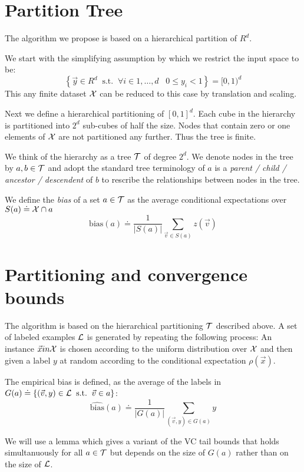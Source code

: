 \documentclass{article}
\newcommand{\X}{{\cal X}}
\renewcommand{\L}{{\cal L}}
\newcommand{\x}{\vec{x}}
\newcommand{\y}{\vec{y}}
\newcommand{\vv}{\vec{v}}
\newcommand{\outcome}{z}
\newcommand{\bias}{\text{bias}}
\newcommand{\empbias}{\widehat{\text{bias}}}
\begin{document}
\iffalse

\section{Partition Tree}

The algorithm we propose is based on a hierarchical partition of $R^d$.

We start with the simplifying assumption by which we restrict the
input space to be:
\newcommand{\Cube}{\text{Cube}}
\[
\left\{\y \in R^d\;\; \text{s.t.}\;\; \forall i \in 1,\ldots,d\;\;\; 0
\leq y_i < 1   \right\} = [0,1)^d
\]
This any finite dataset $\X$ can be reduced to this case by
translation and scaling.

\newcommand{\tree}{{\cal T}}

Next we define a hierarchical partitioning of $[0,1]^d$. Each cube
in the hierarchy is partitioned into $2^d$ sub-cubes of half the size.
Nodes that contain zero or one elements of $\X$ are not partitioned
any further. Thus the tree is finite. 

We think of the hierarchy as a tree $\tree$ of degree $2^d$. We denote
nodes in the tree by $a,b \in \tree$ and adopt the
standard tree terminology of $a$ is a {\em parent / child / ancestor /
  descendent} of $b$ to rescribe the relationships between nodes in
the tree.

We define the {\em bias} of a set $a \in \tree$ as the 
average conditional expectations over $S(a) \doteq \X \cap a$
$$
\bias(a) \doteq \frac{1}{|S(a)|} \sum_{\vv \in S(a)} \outcome(\vv)
$$

\section{Partitioning and convergence bounds}

The algorithm is based on the hierarchical partitioning $\tree$
described above. A set of labeled examples $\L$ is generated by
repeating the following process: An instance $\x in \X$ is chosen
according to the uniform distribution over $\X$ and then given a label
$y$ at random according to the conditional expectation $\rho(\x)$.

The empirical bias is defined, as the average of the labels in
$G(a)\doteq \{(\vv,y) \in \L\;\; \text{s.t.}\;\; \vv \in a\}$:
$$
\empbias(a)\doteq \frac{1}{|G(a)|} \sum_{(\vv,y) \in G(a)} y
$$

We will use a lemma which gives a variant of the VC tail bounds that
holds simultanuously for all $a \in \tree$ but depends on the size of
$G(a)$ rather than on the size of $\L$.
\end{document}
